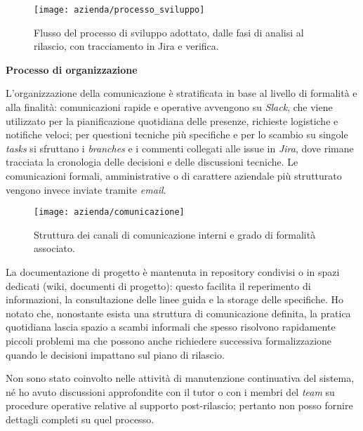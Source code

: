 \begin{figure}[htbp]
    \centering
    \texttt{[image: azienda/processo\_sviluppo]}
    \caption{Flusso del processo di sviluppo adottato, dalle fasi di analisi al rilascio, con tracciamento in Jira e verifica.}
    \label{fig:processo_sviluppo}
\end{figure}


\medskip
\noindent\textbf{Processo di organizzazione}

L’organizzazione della comunicazione è stratificata in base al livello di formalità e alla finalità: 
comunicazioni rapide e operative avvengono su \emph{Slack}, che viene utilizzato per la pianificazione quotidiana delle presenze, richieste logistiche e notifiche veloci; 
per questioni tecniche più specifiche e per lo scambio su singole \emph{tasks} si sfruttano i \emph{branches} e i commenti collegati alle issue in \emph{Jira}, 
dove rimane tracciata la cronologia delle decisioni e delle discussioni tecniche. Le comunicazioni formali, amministrative o di carattere aziendale più strutturato vengono invece inviate tramite \emph{email}.

\begin{figure}[htbp]
    \centering
    \texttt{[image: azienda/comunicazione]}
    \caption{Struttura dei canali di comunicazione interni e grado di formalità associato.}
    \label{fig:comunicazione}
\end{figure}

La documentazione di progetto è mantenuta in repository condivisi o in spazi dedicati (wiki, documenti di progetto): 
questo facilita il reperimento di informazioni, la consultazione delle linee guida e la storage delle specifiche. 
Ho notato che, nonostante esista una struttura di comunicazione definita, la pratica quotidiana lascia spazio a scambi informali che spesso risolvono rapidamente piccoli 
problemi ma che possono anche richiedere successiva formalizzazione quando le decisioni impattano sul piano di rilascio.

Non sono stato coinvolto nelle attività di manutenzione continuativa del sistema, né ho avuto discussioni approfondite con il tutor o con i membri del \emph{team} su procedure 
operative relative al supporto post-rilascio; pertanto non posso fornire dettagli completi su quel processo.





